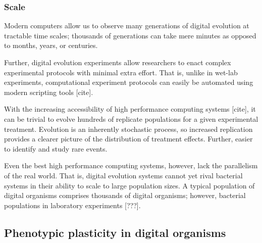 





\subsubsection{Scale}

Modern computers allow us to observe many generations of digital evolution at tractable time scales; thousands of generations can take mere minutes as opposed to months, years, or centuries.

Further, digital evolution experiments allow researchers to enact complex experimental protocols with minimal extra effort. 
That is, unlike in wet-lab experiments, computational experiment protocols can easily be automated using modern scripting tools [cite].

With the increasing accessibility of high performance computing systems [cite], it can be trivial to evolve hundreds of replicate populations for a given experimental treatment. 
Evolution is an inherently stochastic process, so increased replication provides a clearer picture of the distribution of treatment effects. 
Further, easier to identify and study rare events.

Even the best high performance computing systems, however, lack the parallelism of the real world.
That is, digital evolution systems cannot yet rival bacterial systems in their ability to scale to large population sizes. 
A typical population of digital organisms comprises thousands of digital organisms; however, bacterial populations in laboratory experiments [???]. 


\subsection{Phenotypic plasticity in digital organisms}

